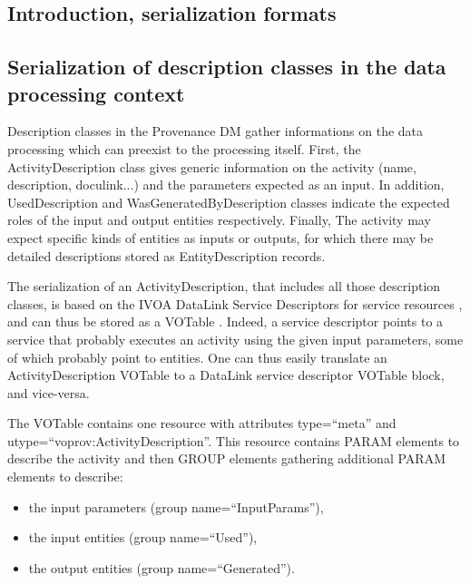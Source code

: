 \subsection{Introduction, serialization formats}
\label{sec:intro-serialization}


\subsection{Serialization of description classes in the data processing context}
\label{sec:description-serialization}

Description classes in the Provenance DM gather informations on the data processing which can preexist to the processing itself.
First, the ActivityDescription class gives generic information on the activity (name, description, doculink...) and the parameters expected as an input. In addition, UsedDescription and WasGeneratedByDescription classes indicate the expected roles of the input and output entities respectively. Finally, The activity may expect specific kinds of entities as inputs or outputs, for which there may be detailed descriptions stored as EntityDescription records.

The serialization of an ActivityDescription, that includes all those description classes, is based on the IVOA DataLink Service Descriptors for service resources \citep{std:Datalink}, and can thus be stored as a VOTable  \citep{std:VOTABLE}. Indeed, a service descriptor points to a service that probably executes an activity using the given input parameters, some of which probably point to entities. One can thus easily translate an ActivityDescription VOTable to a DataLink service descriptor VOTable block, and vice-versa. 

The VOTable contains one resource with attributes type=``meta'' and utype=``voprov:ActivityDescription''. This resource contains PARAM elements to describe the activity and then GROUP elements gathering additional PARAM elements to describe:
\begin{itemize}
 \item the input parameters (group name=``InputParams''),
 \item the input entities (group name=``Used''),
 \item the output entities (group name=``Generated''). 
 \end{itemize} 
 
